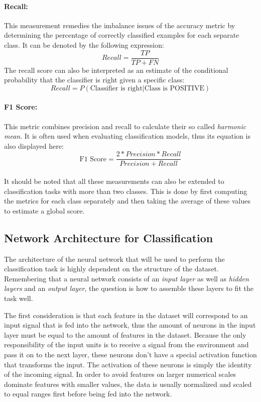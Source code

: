 \paragraph{Recall:} This measurement remedies the imbalance issues of
the accuracy metric by determining the percentage of correctly
classified examples for each separate class. It can be denoted by the
following expression:
\begin{equation}
  Recall = \frac{TP}{TP + FN}
\end{equation}
The recall score can also be interpreted as an estimate of the conditional
probability that the
classifier is right given a specific class:
\begin{equation*}
  Recall = P(\text{Classifier is right} \vert \text{Class is POSITIVE})
\end{equation*}

\paragraph{F1 Score:} This metric combines precision and recall to
calculate their so called \textit{harmonic mean}. It is often used
when evaluating classification models, thus its equation is also
displayed here:
\begin{equation}
  \text{F1 Score} = \frac{2*Precision*Recall}{Precision+Recall}
\end{equation}
\\
It should be noted that all these measurements can also be extended to
classification tasks with more than two classes. This is done
by first computing the metrics for each class separately and then
taking the average of these values to estimate a global score.

\subsection{Network Architecture for Classification}

The architecture of the neural network that will be used to perform
the classification task is highly dependent on the structure of the
dataset. Remembering that a neural network consists of an
\textit{input layer} as well as \textit{hidden layers} and an
\textit{output layer}, the question is how to assemble these layers to
fit the task well.

The first consideration is that each feature in the dataset will
correspond to an input signal that is fed into the network, thus the
amount of neurons in the input layer must be equal to the amount of
features in the dataset. Because the only responsibility of the input
units is to receive a signal from the environment and pass it on to
the next layer, these neurons don't have a special activation function
that transforms the input. The activation of these neurons is simply
the identity of the incoming signal. In order to avoid features on larger
numerical scales dominate features with smaller values, the data is
usually normalized and scaled to equal ranges first before being fed
into the network.

